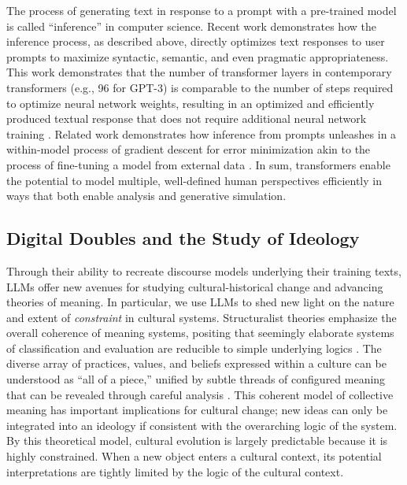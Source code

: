 \documentclass{article}
\begin{document}
The process of generating text in response to a prompt with a
pre-trained model is called ``inference'' in computer science. Recent
work demonstrates how the inference process, as described above,
directly optimizes text responses to user prompts to maximize syntactic,
semantic, and even pragmatic appropriateness. This work demonstrates
that the number of transformer layers in contemporary transformers
(e.g., 96 for GPT-3) is comparable to the number of steps required to
optimize neural network weights, resulting in an optimized and
efficiently produced textual response that does not require additional
neural network training \parencite{Von_Oswald2023-xc}. Related work demonstrates how inference from
prompts unleashes in a within-model process of gradient descent for
error minimization akin to the process of fine-tuning a model from
external data \parencite{Dai2023-bg}. In sum, transformers enable the potential to model multiple,
well-defined human perspectives efficiently in ways that both enable
analysis and generative simulation.

\subsection*{Digital Doubles and the Study of Ideology}

Through their ability to recreate discourse models underlying their
training texts, LLMs offer new avenues for studying cultural-historical
change and advancing theories of meaning. In particular, we use LLMs to
shed new light on the nature and extent of \emph{constraint} in cultural
systems. Structuralist theories emphasize the overall coherence of
meaning systems, positing that seemingly elaborate systems of
classification and evaluation are reducible to simple underlying logics
\parencite{Douglas1966-re, Levi-Strauss1966-fw}. The diverse array of practices, values, and beliefs
expressed within a culture can be understood as ``all of a piece,''
unified by subtle threads of configured meaning that can be revealed
through careful analysis
\parencite{Mead1942-zm}. This coherent
model of collective meaning has important implications for cultural
change; new ideas can only be integrated into an ideology if consistent
with the overarching logic of the system. By this theoretical model,
cultural evolution is largely predictable because it is highly
constrained. When a new object enters a cultural context, its potential
interpretations are tightly limited by the logic of the cultural
context.
\end{document}
